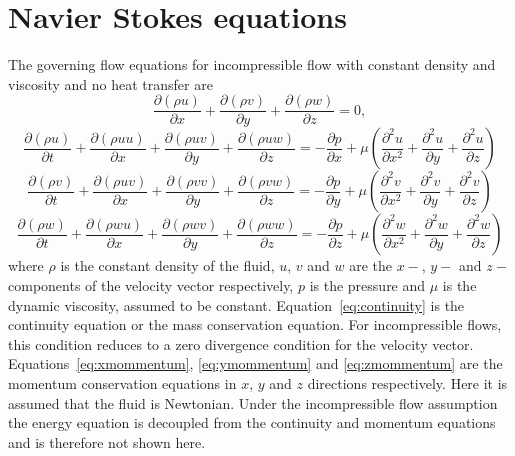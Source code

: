 \section{Navier Stokes equations}
The governing flow equations for incompressible flow with constant density and viscosity and no heat transfer are 
\begin{equation}
\frac{\partial (\rho u)}{\partial x} + \frac{\partial (\rho v)}{\partial y} + \frac{\partial (\rho w)}{\partial z} = 0,
\label{eq:continuity}
\end{equation}
\begin{equation}
\frac{\partial (\rho u)}{\partial t} + \frac{\partial (\rho u u)}{\partial x}+ \frac{\partial (\rho uv)}{\partial y} + \frac{\partial (\rho uw)}{\partial z} = -\frac{\partial p}{\partial x} + \mu\left(\frac{\partial^2 u}{\partial x^2} + \frac{\partial^2 u}{\partial y} + \frac{\partial^2 u}{\partial z}\right)
\label{eq:xmommentum}
\end{equation}
\begin{equation}
\frac{\partial (\rho v)}{\partial t} + \frac{\partial (\rho uv)}{\partial x}+ \frac{\partial (\rho vv)}{\partial y} + \frac{\partial (\rho vw)}{\partial z} = -\frac{\partial p}{\partial y} + \mu\left(\frac{\partial^2 v}{\partial x^2} + \frac{\partial^2 v}{\partial y} + \frac{\partial^2 v}{\partial z}\right)
\label{eq:ymommentum}
\end{equation}
\begin{equation}
\frac{\partial (\rho w)}{\partial t} + \frac{\partial (\rho wu)}{\partial x}+ \frac{\partial (\rho wv)}{\partial y} + \frac{\partial (\rho ww)}{\partial z} = -\frac{\partial p}{\partial z} + \mu\left(\frac{\partial^2 w}{\partial x^2} + \frac{\partial^2 w}{\partial y} + \frac{\partial^2 w}{\partial z}\right)
\label{eq:zmommentum}
\end{equation}
where $\rho$ is the constant density of the fluid, $u$, $v$ and $w$ are the $x-$, $y-$ and $z-$ components of the velocity vector respectively, $p$ is the pressure and $\mu$ is the dynamic viscosity, assumed to be constant. Equation~\ref{eq:continuity} is the continuity equation or the mass conservation equation. For incompressible flows, this condition reduces to a zero divergence condition for the velocity vector. Equations~\ref{eq:xmommentum}, \ref{eq:ymommentum} and \ref{eq:zmommentum} are the momentum conservation equations in $x$, $y$ and $z$ directions respectively. Here it is assumed that the fluid is Newtonian. Under the incompressible flow assumption the energy equation is decoupled from the continuity and momentum equations and is therefore not shown here.
